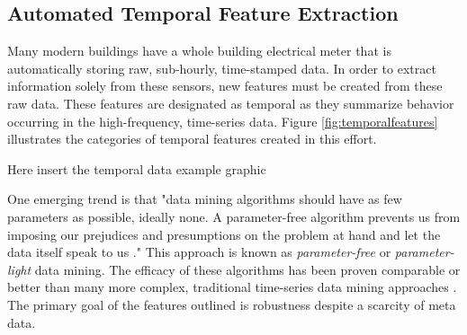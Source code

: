 \subsection{Automated Temporal Feature Extraction}
Many modern buildings have a whole building electrical meter that is automatically storing raw, sub-hourly, time-stamped data. In order to extract information solely from these sensors, new features must be created from these raw data.  These features are designated as temporal as they summarize behavior occurring in the high-frequency, time-series data. Figure \ref{fig:temporalfeatures} illustrates the categories of temporal features created in this effort.

Here insert the temporal data example graphic

One emerging trend is that "data mining algorithms should have as few parameters as possible, ideally none. A parameter-free algorithm prevents us from imposing our prejudices and presumptions on the problem at hand and let the data itself speak to us \cite{Keogh:2004vp}." This approach is known as \emph{parameter-free} or \emph{parameter-light} data mining. The efficacy of these algorithms has been proven comparable or better than many more complex, traditional time-series data mining approaches \cite{Keogh:2004vp}. The primary goal of the features outlined is robustness despite a scarcity of meta data.
